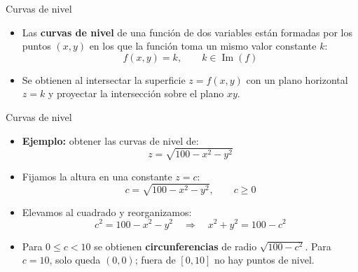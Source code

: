 \documentclass[main.tex]{subfiles}
\begin{document}

\begin{frame}{Curvas de nivel}
  \begin{itemize}
    \item Las \textbf{curvas de nivel} de una función de dos variables
          están formadas por los puntos $(x,y)$ en los que la función
          toma un mismo valor constante $k$:
          \[
            f(x,y)=k,\qquad k\in\operatorname{Im}(f)
          \]

    \item Se obtienen al intersectar la superficie $z=f(x,y)$ con
          un plano horizontal $z=k$ y proyectar la intersección sobre
          el plano $xy$.
  \end{itemize}

\end{frame}

\begin{frame}{Curvas de nivel}
  \small
  \begin{itemize}
    \item \textbf{Ejemplo:} obtener las curvas de nivel de:
          \[
            z=\sqrt{100-x^2-y^2}
          \]

    \item Fijamos la altura en una constante $z=c$:
          \[
            c=\sqrt{100-x^2-y^2},\qquad c\geq 0
          \]

    \item Elevamos al cuadrado y reorganizamos:
          \[
            c^2=100-x^2-y^2
            \quad\Longrightarrow\quad
            x^2+y^2=100-c^2
          \]

    \item Para $0\leq c<10$ se obtienen \textbf{circunferencias}
          de radio $\sqrt{100-c^2}$. Para $c=10$, solo queda $(0,0)$;
          fuera de $[0,10]$ no hay puntos de nivel.
  \end{itemize}
\end{frame}
\end{document}
